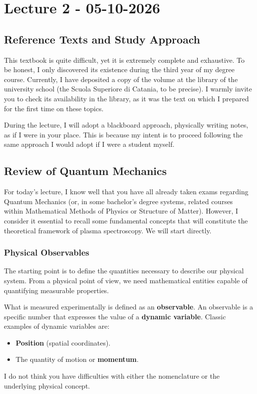\chapter{Lecture 2 - 05-10-2026}

\section{Reference Texts and Study Approach}

This textbook is quite difficult, yet it is extremely complete and exhaustive. To be honest, I only discovered its existence during the third year of my degree course. Currently, I have deposited a copy of the volume at the library of the university school (the Scuola Superiore di Catania, to be precise). I warmly invite you to check its availability in the library, as it was the text on which I prepared for the first time on these topics.

During the lecture, I will adopt a blackboard approach, physically writing notes, as if I were in your place. This is because my intent is to proceed following the same approach I would adopt if I were a student myself.

\section{Review of Quantum Mechanics}

For today's lecture, I know well that you have all already taken exams regarding Quantum Mechanics (or, in some bachelor's degree systems, related courses within Mathematical Methods of Physics or Structure of Matter). However, I consider it essential to recall some fundamental concepts that will constitute the theoretical framework of plasma spectroscopy. We will start directly.

\subsection{Physical Observables}

The starting point is to define the quantities necessary to describe our physical system. From a physical point of view, we need mathematical entities capable of quantifying measurable properties.

What is measured experimentally is defined as an \textbf{observable}.
An observable is a specific number that expresses the value of a \textbf{dynamic variable}. Classic examples of dynamic variables are:
\begin{itemize}
\item \textbf{Position} (spatial coordinates).
\item The quantity of motion or \textbf{momentum}.
\end{itemize}
I do not think you have difficulties with either the nomenclature or the underlying physical concept.


